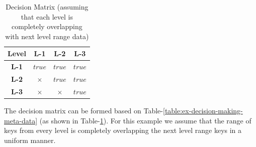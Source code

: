 \begin{table}
    \captionsetup{justification=centering,margin=2cm}
    \begin{tabular}{ |c|c|c|c| }
        \hline
        \textbf{Level} & \textbf{L-1} & \textbf{L-2} & \textbf{L-3} \\
        \hline
        \textbf{L-1} & $true$ & $true$ & $true$ \\
        \hline
        \textbf{L-2} & $\times$ & $true$ & $true$ \\
        \hline
        \textbf{L-3} &  $\times$ &  $\times$ & $true$ \\
        \hline
    \end{tabular}
    \caption{Decision Matrix (assuming that each level is completely overlapping with next level range data)}
    \label{table:ex-decision-matrix}
\end{table}

The decision matrix can be formed based on Table-\ref{table:ex-decision-making-meta-data} (as shown in 
Table-\ref{table:ex-decision-matrix}). For this example we assume that the range of keys from every level is completely
overlapping the next level range keys in a uniform manner.




















